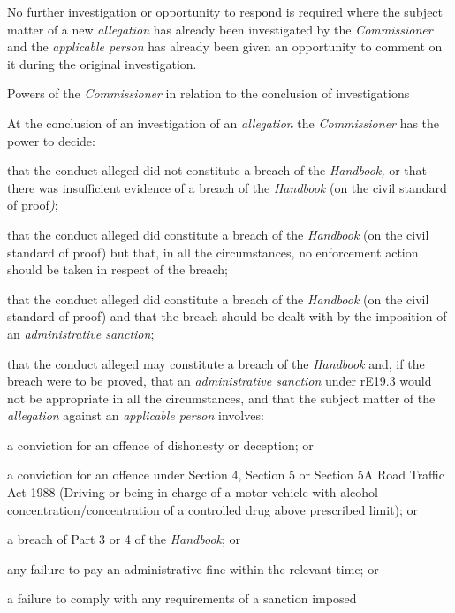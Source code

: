 No further investigation or opportunity to respond is required where the
subject matter of a new \emph{allegation} has already been investigated
by the \emph{Commissioner} and the \emph{applicable person} has already
been given an opportunity to comment on it during the original
investigation.\\
\par
Powers of the \emph{Commissioner} in relation to the conclusion of
investigations\\
\par
At the conclusion of an investigation of
an \emph{allegation} the \emph{Commissioner} has the power to decide:\\\nl \item that the conduct alleged did not constitute a breach of
the \emph{Handbook,} or that there was insufficient evidence of a breach
of the \emph{Handbook} (on the civil standard of proof\emph{)};
\item that the conduct alleged did constitute a breach of
the \emph{Handbook} (on the civil standard of proof) but that, in all
the circumstances, no enforcement action should be taken in respect of
the breach;
\item that the conduct alleged did constitute a breach of
the \emph{Handbook} (on the civil standard of proof) and that the breach
should be dealt with by the imposition of an \emph{administrative
sanction};
\item that the conduct alleged may constitute a breach of
the \emph{Handbook} and, if the breach were to be proved, that
an \emph{administrative sanction} under rE19.3 would not be appropriate
in all the circumstances, and that the subject matter of
the \emph{allegation} against an \emph{applicable person} involves:\\
\al
\item a conviction for an offence of dishonesty or deception; or\item a conviction for an offence under Section 4, Section 5 or Section 5A
Road Traffic Act 1988 (Driving or being in charge of a motor vehicle
with alcohol concentration/concentration of a controlled drug above
prescribed limit); or\item a breach of Part 3 or 4 of the \emph{Handbook}; or\item any failure to pay an administrative fine within the relevant time;
or\item a failure to comply with any requirements of a sanction imposed
